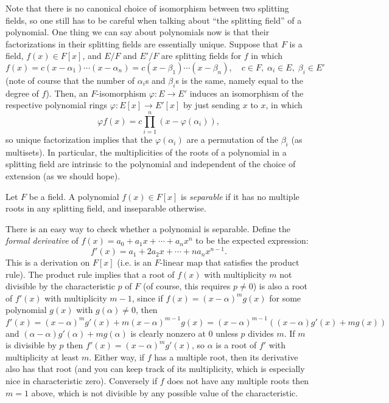 \documentclass[10pt]{article}
\providecommand{\vocab}[1]{{{\sffamily\textit{#1}}}}
\begin{document}
Note that there is no canonical choice of isomorphism
between two splitting fields, so one still has to be careful
when talking about ``the splitting field'' of a polynomial.
One thing we can say about polynomials now is that
their factorizations in their splitting fields
are essentially unique. Suppose that $F$ is a field, $f(x)\in F[x]$,
and $E/F$ and $E'/F$ are splitting fields for $f$ in which
\begin{equation*}
    f(x) = c(x-\alpha_1)\cdots(x-\alpha_n)
    = c(x-\beta_1)\cdots(x-\beta_n),
    \quad c\in F,\; \alpha_i\in E,\;\beta_i\in E'
\end{equation*}
(note of course that the number of $\alpha_i$s and $\beta_i$s
is the same, namely equal to the degree of $f$).
Then, an $F$-isomorphism $\varphi\colon E\to E'$
induces an isomorphism of the respective polynomial rings
$\varphi\colon E[x]\to E'[x]$ by just sending $x$ to $x$, in which
\begin{equation*}
    \varphi f(x) = c\prod_{i=1}^n (x-\varphi(\alpha_i)),
\end{equation*}
so unique factorization implies that the $\varphi(\alpha_i)$
are a permutation of the $\beta_i$ (as multisets).
In particular, the multiplicities of the roots of a polynomial
in a splitting field are intrinsic to the polynomial
and independent of the choice of extension (as we should hope).

\begin{definition}
    \label{def:separable-polynomial}
    Let $F$ be a field. A polynomial $f(x)\in F[x]$
    is \vocab{separable} if it has no multiple roots
    in any splitting field, and inseparable otherwise.
\end{definition}

There is an easy way to check whether a polynomial is separable.
Define the \vocab{formal derivative} of $f(x) = a_0 + a_1x + \cdots + a_nx^n$
to be the expected expression:
\begin{equation*}
    f'(x) = a_1 + 2a_2x + \cdots + na_nx^{n-1}.
\end{equation*}
This is a derivation on $F[x]$ (i.e. is an $F$-linear map
that satisfies the product rule).
The product rule implies that a root of $f(x)$ with multiplicity $m$
not divisible by the characteristic $p$ of $F$
(of course, this requires $p\ne 0$)
is also a root of $f'(x)$ with multiplicity $m-1$,
since if $f(x) = (x-\alpha)^m g(x)$ for some polynomial $g(x)$
with $g(\alpha)\ne 0$, then
\begin{equation*}
    f'(x) = (x-\alpha)^m g'(x) + m(x-\alpha)^{m-1}g(x)
    = (x-\alpha)^{m-1}((x-\alpha)g'(x) + mg(x))
\end{equation*}
and $(\alpha-\alpha)g'(\alpha) + mg(\alpha)$ is clearly nonzero at $0$
unless $p$ divides $m$.
If $m$ is divisible by $p$ then $f'(x) = (x-\alpha)^m g'(x)$,
so $\alpha$ is a root of $f'$ with multiplicity at least $m$.
Either way, if $f$ has a multiple root, then its derivative
also has that root (and you can keep track of its multiplicity,
which is especially nice in characteristic zero).
Conversely if $f$ does not have any multiple roots
then $m = 1$ above, which is not divisible
by any possible value of the characteristic.
\end{document}
